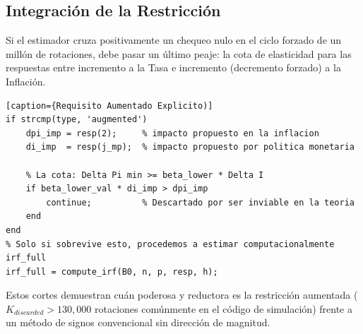 \documentclass[11pt,a4paper]{article}
\begin{document}
\subsection{Integración de la Restricción}
Si el estimador cruza positivamente un chequeo nulo en el ciclo forzado de un millón de rotaciones, debe pasar un último peaje: la cota de elasticidad para las respuestas entre incremento a la Tasa e incremento (decremento forzado) a la Inflación.

\begin{lstlisting}[caption={Requisito Aumentado Explicito)]
if strcmp(type, 'augmented')
    dpi_imp = resp(2);     % impacto propuesto en la inflacion 
    di_imp  = resp(j_mp);  % impacto propuesto por politica monetaria
    
    % La cota: Delta Pi min >= beta_lower * Delta I
    if beta_lower_val * di_imp > dpi_imp
        continue;          % Descartado por ser inviable en la teoria
    end
end
% Solo si sobrevive esto, procedemos a estimar computacionalmente irf_full
irf_full = compute_irf(B0, n, p, resp, h);
\end{lstlisting}

Estos cortes demuestran cuán poderosa y reductora es la restricción aumentada ($K_{discarded} > 130,000$ rotaciones comúnmente en el código de simulación) frente a un método de signos convencional sin dirección de magnitud.
\end{document}
